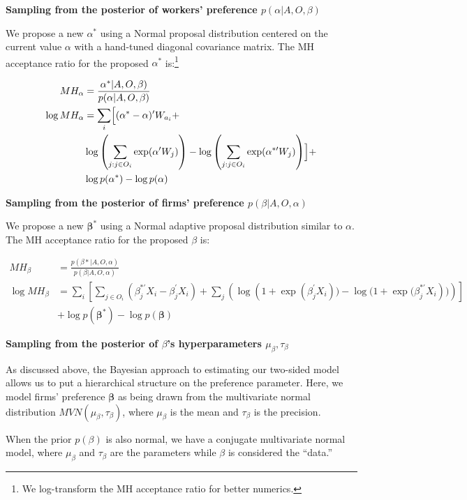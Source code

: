 \textbf{Sampling from the posterior of workers' preference $p(\alpha|A, O,
  \beta)$}

We propose a new $\alpha^*$ using a Normal proposal distribution centered on the
current value $\alpha$ with a hand-tuned diagonal covariance matrix. The MH
acceptance ratio for the proposed $\alpha^*$ is:\footnote{We log-transform the
  MH acceptance ratio for better numerics.}

\begin{align}
  MH_\alpha &= \frac{\alpha^*|A, O, \beta)}{p(\alpha | A, O, \beta)} \\
  \log MH_\alpha &= \sum_i \Bigl[ (\alpha^* - \alpha)' W_{a_i} + \nonumber \\
            & \log\left(\sum\limits_{j:j \in O_i} \exp(\alpha' W_j)\right) -
              \log\left(\sum\limits_{j:j \in O_i} \exp(\alpha^{*\prime} W_j)\right) \Bigr] + \nonumber\\
            & \log p(\alpha^*) - \log p(\alpha)
\end{align}

\textbf{Sampling from the posterior of firms' preference $p(\beta|A, O,
  \alpha)$}

We propose a new $\bm{\beta}^*$ using a Normal adaptive proposal distribution
similar to $\alpha$. The MH acceptance ratio for the proposed $\beta$ is:

\begin{align}
  MH_\beta &= \frac{p(\beta* | A, O, \alpha)}{p(\beta | A, O, \alpha)} \\
  \log MH_\beta &= \sum_i \left[ \sum_{j \in O_i} \left(\beta_j^{*\prime}X_i - \beta_j^{\prime}X_i \right) + \sum_{j} \left( \log(1 + {\exp({\beta_j^{\prime}X_i})) - \log(1 +  \exp(\beta_j^{*\prime}X_i})) \right) \right] \nonumber \\
           & + \log p(\bm{\beta}^*) - \log p(\bm{\beta})
\end{align}


\textbf{Sampling from the posterior of $\beta$'s hyperparameters $\mu_{\beta},
  \tau_{\beta}$}

As discussed above, the Bayesian approach to estimating our two-sided model
allows us to put a hierarchical structure on the preference parameter. Here, we
model firms' preference $\bm{\beta}$ as being drawn from the multivariate normal
distribution $MVN(\mu_{\beta}, \tau_{\beta})$, where $\mu_{\beta}$ is the mean
and $\tau_{\beta}$ is the precision.

When the prior $p(\beta)$ is also normal, we have a conjugate multivariate
normal model, where $\mu_{\beta}$ and $\tau_{\beta}$ are the parameters while
$\beta$ is considered the ``data.''

